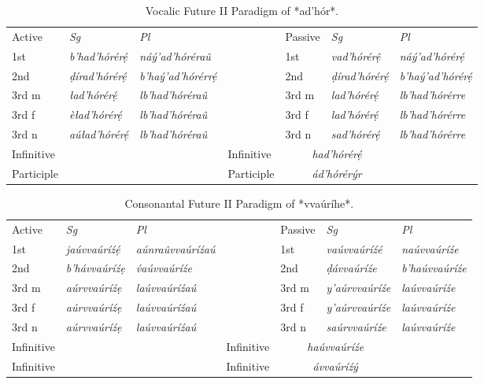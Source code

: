 \documentclass[a4paper, 12pt, oneside, final]{article}
\let \nf \normalfont
\def \d {ḍ}
\begin{document}
\begin{table}[H]
\centering
\noindent\begin{tabular}{@{}|>{}l|>{\it}l|>{\it}l|>{}l|>{}l|>{\it}l|>{\it}l|}\cline{1-3}\cline{5-7}
Active&\nf Sg&\nf Pl& & Passive&\nf Sg&\nf Pl\\\cline{1-3}\cline{5-7}
1st   &b’had’hórérẹ́  &náý’ad’hóréraû      &&1st    &vad’hórérệ    &náý’ad’hórérẹ́   \\\cline{1-3}\cline{5-7}
2nd   &ḍírad’hórérẹ́  &b’haý’ad’hórérrẹ́    &&2nd    &ḍírad’hórérẹ́  &b’haý’ad’hórérẹ́ \\\cline{1-3}\cline{5-7}
3rd m &ład’hórérẹ́    &lb’had’hóréraû      &&3rd m  &lad’hórérẹ́    &lb’had’hórérre  \\\cline{1-3}\cline{5-7}
3rd f &èład’hórérẹ́   &lb’had’hóréraû      &&3rd f  &lad’hórérẹ́    &lb’had’hórérre  \\\cline{1-3}\cline{5-7}
3rd n &aúład’hórérẹ́  &lb’had’hóréraû      &&3rd n  &sad’hórérẹ́    &lb’had’hórérre  \\\cline{1-3}\cline{5-7}
Infinitive&\multicolumn{2}{c|}{\it dad’hóréré}&&Infinitive&\multicolumn{2}{c|}{\it had’hórérẹ́}\\\cline{1-3}\cline{5-7}
Participle&\multicolumn{2}{c|}{\it ad’hórérŷr}&&Participle&\multicolumn{2}{c|}{\it ád’hórérýr}\\\cline{1-3}\cline{5-7}
\end{tabular}
\caption{Vocalic Future II Paradigm of *ad’hór*.}\label{tab:future-2-adhor}
\end{table}

\begin{table}[H]
\centering
\noindent\begin{tabular}{@{}|>{}l|>{\it}l|>{\it}l|>{}l|>{}l|>{\it}l|>{\it}l|}\cline{1-3}\cline{5-7}
Active&\nf Sg&\nf Pl& & Passive&\nf Sg&\nf Pl\\\cline{1-3}\cline{5-7}
1st   &jaúvvaúríźẹ́  &aúnraûvvaúríźaú &&1st   &vaúvvaúríźé    &naúvvaúríźe       \\\cline{1-3}\cline{5-7}
2nd   &b’hávvaúríźẹ &v́aúvvaúríźe     &&2nd   &\d{}ávvaúríźe  &b’haúvvaúríźe     \\\cline{1-3}\cline{5-7}
3rd m &aúrvvaúríźẹ  &laúvvaúríźaú    &&3rd m &y’aúrvvaúríźe  &laúvvaúríźe \\\cline{1-3}\cline{5-7}
3rd f &aúrvvaúríźẹ  &laúvvaúríźaú    &&3rd f &y’aúrvvaúríźe  &laúvvaúríźe \\\cline{1-3}\cline{5-7}
3rd n &aúrvvaúríźẹ  &laúvvaúríźaú    &&3rd n &saúrvvaúríźe   &laúvvaúríźe \\\cline{1-3}\cline{5-7}
Infinitive&\multicolumn{2}{c|}{\it dẹvvaúríźè}&&Infinitive&\multicolumn{2}{c|}{\it haúvvaúríźe}\\\cline{1-3}\cline{5-7}
Infinitive&\multicolumn{2}{c|}{\it vvaúríźŷ}&&Infinitive&\multicolumn{2}{c|}{\it ávvaúríźý}\\\cline{1-3}\cline{5-7}
\end{tabular}
\caption{Consonantal Future II Paradigm of *vvaúríhe*.}\label{tab:future-2-vvaurihe}
\end{table}
\end{document}
